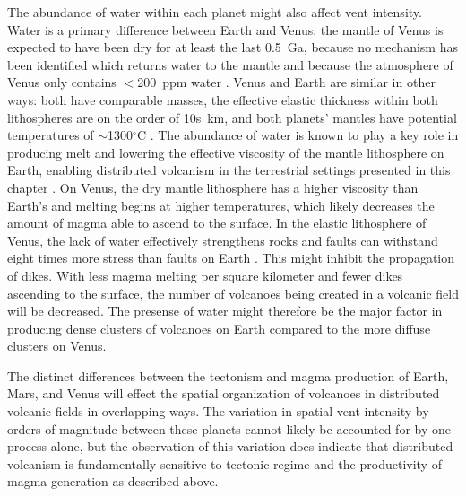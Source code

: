 The abundance of water within each planet might also affect vent intensity. Water is a primary difference between Earth and Venus: the mantle of Venus is expected to have been dry for at least the last 0.5~Ga, because no mechanism has been identified which returns water to the mantle and because the atmosphere of Venus only contains $<$200~ppm water \citep{donahue1992past,nimmo1998volcanism}. Venus and Earth are similar in other ways: both have comparable masses, the effective elastic thickness within both lithospheres are on the order of 10s~km, and both planets' mantles have potential temperatures of $\sim$1300$^{\circ}$C \citep{nimmo1998volcanism}. The abundance of water is known to play a key role in producing melt and lowering the effective viscosity of the mantle lithosphere on Earth, enabling distributed volcanism in the terrestrial settings presented in this chapter \citep{dixon2004lateral}. On Venus, the dry mantle lithosphere has a higher viscosity than Earth's and melting begins at higher temperatures, which likely decreases the amount of magma able to ascend to the surface. In the elastic lithosphere of Venus, the lack of water effectively strengthens rocks and faults can withstand eight times more stress than faults on Earth \citep{nimmo1998volcanism}. This might inhibit the propagation of dikes. With less magma melting per square kilometer and fewer dikes ascending to the surface, the number of volcanoes being created in a volcanic field will be decreased. The presense of water might therefore be the major factor in producing dense clusters of volcanoes on Earth compared to the more diffuse clusters on Venus.

The distinct differences between the tectonism and magma production of Earth, Mars, and Venus will effect the spatial organization of volcanoes in distributed volcanic fields in overlapping ways. The variation in spatial vent intensity by orders of magnitude between these planets cannot likely be accounted for by one process alone, but the observation of this variation does indicate that distributed volcanism is fundamentally sensitive to tectonic regime and the productivity of magma generation as described above.



